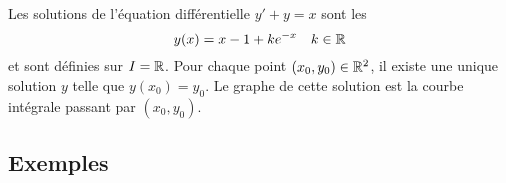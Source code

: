 \documentclass[class=report,crop=false]{standalone}
\begin{document}
\begin{exemple}
Les solutions de l'équation différentielle
$y'+y=x$ sont les
$$y(x) = x-1 + ke^{-x} \quad k \in\mathbb{R}$$
et sont définies sur $I=\mathbb{R}$.
Pour chaque point $(x_0,y_0) \in \mathbb{R}^2$, il existe une unique solution
$y$ telle que $y(x_0)=y_0$. Le graphe de cette solution
est la courbe intégrale passant par $(x_0,y_0)$.


\end{exemple}


\subsection{Exemples}
\end{document}
